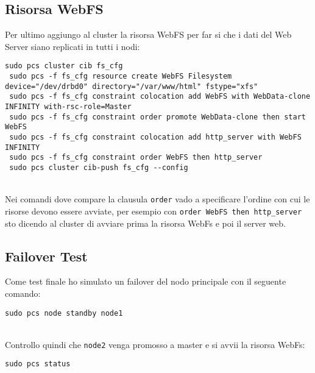 \subsection{Risorsa WebFS}

Per ultimo aggiungo al cluster la risorsa WebFS per far si che i dati del Web Server siano replicati in tutti i nodi:

\begin{lstlisting}[style=cmd]
 sudo pcs cluster cib fs_cfg
 sudo pcs -f fs_cfg resource create WebFS Filesystem device="/dev/drbd0" directory="/var/www/html" fstype="xfs"
 sudo pcs -f fs_cfg constraint colocation add WebFS with WebData-clone INFINITY with-rsc-role=Master
 sudo pcs -f fs_cfg constraint order promote WebData-clone then start WebFS
 sudo pcs -f fs_cfg constraint colocation add http_server with WebFS INFINITY
 sudo pcs -f fs_cfg constraint order WebFS then http_server
 sudo pcs cluster cib-push fs_cfg --config
\end{lstlisting}
\ \\
Nei comandi dove compare la clausula \lstinline[style=cmd]|order| vado a specificare l'ordine con cui le risorse devono essere avviate, per esempio con \lstinline[style=cmd]|order WebFS then http_server| sto dicendo al cluster di avviare prima la risorsa WebFs e poi il server web.

\subsection{Failover Test}

Come test finale ho simulato un failover del nodo principale con il seguente comando:

\begin{lstlisting}[style=cmd]
 sudo pcs node standby node1
\end{lstlisting}
\ \\
Controllo quindi che \lstinline[style=cmd]|node2| venga promosso a master e si avvii la risorsa WebFs:

\begin{lstlisting}[style=cmd]
 sudo pcs status
\end{lstlisting}


